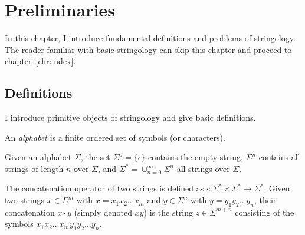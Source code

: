 
\chapter{Preliminaries}

In this chapter, I introduce fundamental definitions and problems of stringology.
The reader familiar with basic stringology can skip this chapter and proceed to chapter~\ref{chr:index}.

\section{Definitions}

I introduce primitive objects of stringology and give basic definitions.

\begin{definition}
\label{def:alpha}
An \emph{alphabet} is a finite ordered set of symbols (or characters).
\end{definition}


\begin{definition}
Given an alphabet $\Sigma$, the set $\Sigma^0=\{ \epsilon \}$ contains the empty string, $\Sigma^n$ contains all strings of length $n$ over $\Sigma$, and $\Sigma^* = \cup_{n=0}^{\infty}{\Sigma^n}$ all strings over $\Sigma$.
\end{definition}

\begin{definition}
The concatenation operator of two strings is defined as $\cdot : \Sigma^* \times \Sigma^* \rightarrow \Sigma^*$.
Given two strings $x \in \Sigma^m$ with $x=x_1 x_2 \dots x_m$ and $y \in \Sigma^n$ with $y=y_1 y_2 \dots y_n$, their concatenation $x \cdot y$ (simply denoted $xy$) is the string $z \in \Sigma^{m+n}$ consisting of the symbols $x_1 x_2 \dots x_m y_1 y_2 \dots y_n$.
\end{definition}


